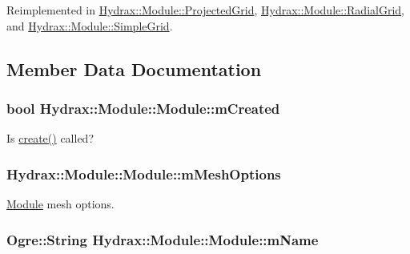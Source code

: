 Reimplemented in \hyperlink{class_hydrax_1_1_module_1_1_projected_grid_8d7a8efcd6b7fd0e4313c9114bd2c061}{Hydrax::Module::ProjectedGrid}, \hyperlink{class_hydrax_1_1_module_1_1_radial_grid_ee5199bfbee4429ab428d477e36443dd}{Hydrax::Module::RadialGrid}, and \hyperlink{class_hydrax_1_1_module_1_1_simple_grid_aa120d4f487785136a3134cc8980fb16}{Hydrax::Module::SimpleGrid}.

\subsection{Member Data Documentation}
\hypertarget{class_hydrax_1_1_module_1_1_module_2b11bdd4cec12b483489e3987802a091}{
\subsubsection[{mCreated}]{\setlength{\rightskip}{0pt plus 5cm}bool {\bf Hydrax::Module::Module::mCreated}}}
\label{class_hydrax_1_1_module_1_1_module_2b11bdd4cec12b483489e3987802a091}


Is \hyperlink{class_hydrax_1_1_module_1_1_module_4b696328c3fc1496f757e929f44f3258}{create()} called? 

\hypertarget{class_hydrax_1_1_module_1_1_module_99e803991d3d249baed293bdb40c56ed}{
\subsubsection[{mMeshOptions}]{ {\bf Hydrax::Module::Module::mMeshOptions}}}
\label{class_hydrax_1_1_module_1_1_module_99e803991d3d249baed293bdb40c56ed}


\hyperlink{class_hydrax_1_1_module_1_1_module}{Module} mesh options. 

\hypertarget{class_hydrax_1_1_module_1_1_module_a478452f0e9c1bf8dde1526b30759de1}{
\subsubsection[{mName}]{\setlength{\rightskip}{0pt plus 5cm}Ogre::String {\bf Hydrax::Module::Module::mName}}}
\label{class_hydrax_1_1_module_1_1_module_a478452f0e9c1bf8dde1526b30759de1}


